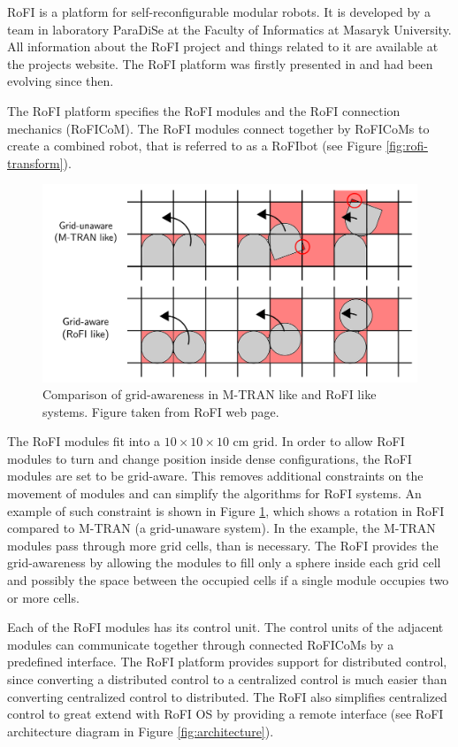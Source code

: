 \documentclass[
  printed, %
  color,   %
  notable, %
  oneside, %
  nolof,   %
  nolot,   %
  nocover,
]{fithesis3}
\begin{document}
RoFI is a platform for self-reconfigurable modular robots.
It is developed by a team in laboratory ParaDiSe\cite{paradise-web} at the Faculty of Informatics at Masaryk University.
All information about the RoFI project and things related to it are available at the projects website\cite{rofi-web}.
The RoFI platform was firstly presented in \cite{rofi-thesis} and had been evolving since then.

The RoFI platform specifies the RoFI modules and the RoFI connection mechanics (RoFICoM).
The RoFI modules connect together by RoFICoMs to create a combined robot, that is referred to as a RoFIbot\label{rofibot} (see Figure \ref{fig:rofi-transform}).

\begin{figure}
    \centering
    \includegraphics[width=\linewidth]{data/grid_aware.pdf}
    \caption{Comparison of grid-awareness in M-TRAN like and RoFI like systems. Figure taken from RoFI web page\cite{rofi-web}.}
    \label{fig:grid-aware}
\end{figure}

The RoFI modules fit into a $10 \times 10 \times 10$ cm grid.
In order to allow RoFI modules to turn and change position inside dense configurations, the RoFI modules are set to be grid-aware.
This removes additional constraints on the movement of modules and can simplify the algorithms for RoFI systems.
An example of such constraint is shown in Figure \ref{fig:grid-aware}, which shows a rotation in RoFI compared to M-TRAN\cite{mtran} (a grid-unaware system).
In the example, the M-TRAN modules pass through more grid cells, than is necessary.
The RoFI provides the grid-awareness by allowing the modules to fill only a sphere inside each grid cell and possibly the space between the occupied cells if a single module occupies two or more cells.

Each of the RoFI modules has its control unit.
The control units of the adjacent modules can communicate together through connected RoFICoMs by a predefined interface.
The RoFI platform provides support for distributed control, since converting a distributed control to a centralized control is much easier than converting centralized control to distributed.
The RoFI also simplifies centralized control to great extend with RoFI OS by providing a remote interface (see RoFI architecture diagram in Figure \ref{fig:architecture}).
\end{document}
